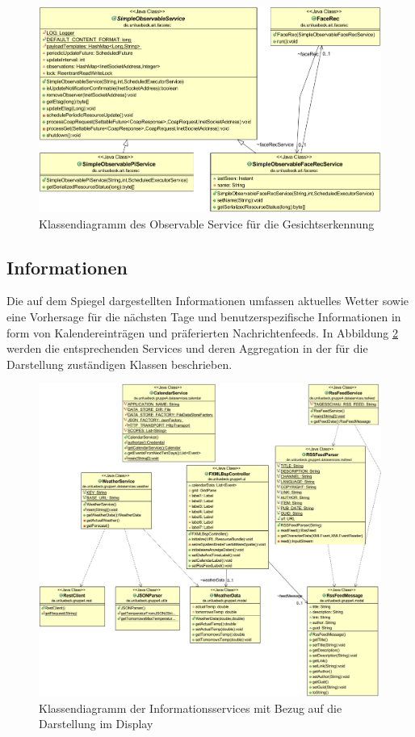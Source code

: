 \begin{figure}
	\centering
	\includegraphics[width=1\textwidth]{figures/facerecservice.png}
	\caption{Klassendiagramm des Observable Service für die Gesichtserkennung}
	\label{img:facerec}
\end{figure}


\subsection{Informationen}
\label{subsec:information}

Die auf dem Spiegel dargestellten Informationen umfassen aktuelles Wetter sowie eine Vorhersage für die nächsten Tage und benutzerspezifische Informationen in form von Kalendereinträgen und präferierten Nachrichtenfeeds. In Abbildung \ref{img:infoclasses} werden die entsprechenden Services und deren Aggregation in der für die Darstellung zuständigen Klassen beschrieben.

\begin{figure}
	\centering
	\includegraphics[width=1\textwidth]{figures/infoclasses.png}
	\caption{Klassendiagramm der Informationsservices mit Bezug auf die Darstellung im Display}
	\label{img:infoclasses}
\end{figure}


